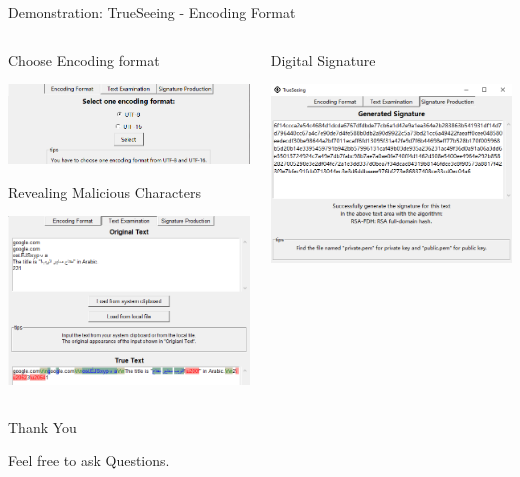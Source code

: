 \documentclass{beamer}
\begin{document}
\begin{frame}{Demonstration: TrueSeeing - Encoding Format}
\begin{columns}
    \begin{column}{.6\textwidth}
        \centering
        Choose Encoding format
        
        \includegraphics[width=.8\columnwidth]{assets/Encode.png}

        Revealing Malicious Characters
        
        \includegraphics[width=.8\columnwidth]{assets/text.png}
    \end{column}
    
    \begin{column}{.5\textwidth}
        \centering
        Digital Signature

		\includegraphics[width=\columnwidth]{assets/signature.png}
    \end{column}
\end{columns}
\end{frame}


\begin{frame}{Thank You}
\begin{center}
	\Huge Feel free to ask Questions.
\end{center}
\end{frame}
	
\end{document}
